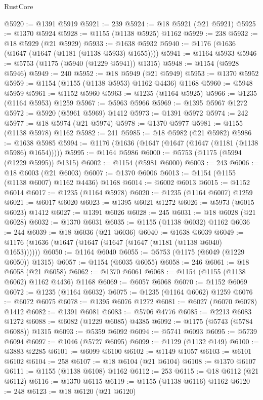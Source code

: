 \begin{lexlean}{RustCore}
\begin{coremodule}
@5920 := @1391 @5919
@5921 := 239
@5924 := @18 @5921 (@21 @5921)
@5925 := @1370 @5924
@5928 := @1155 (@1138 @5925) @1162
@5929 := 238
@5932 := @18 @5929 (@21 @5929)
@5933 := @1638 @5932
@5940 := @1176 (@1636 (@1647 (@1647 (@1181 (@1138 @5933) @1655))))
@5941 := @1164 @5933
@5946 := @5753 (@1175 (@5940 (@1229 @5941)) @1315)
@5948 := @1154 (@5928 @5946)
@5949 := 240
@5952 := @18 @5949 (@21 @5949)
@5953 := @1370 @5952
@5959 := @1154 (@1155 (@1138 @5953) @1162 @4436) @1168
@5960 := @5948 @5959
@5961 := @1152 @5960
@5963 := @1235 (@1164 @5925)
@5966 := @1235 (@1164 @5953) @1259
@5967 := @5963 @5966
@5969 := @1395 @5967 @1272
@5972 := @5920 (@5961 @5969) @1412
@5973 := @1391 @5972
@5974 := 242
@5977 := @18 @5974 (@21 @5974)
@5978 := @1370 @5977
@5981 := @1155 (@1138 @5978) @1162
@5982 := 241
@5985 := @18 @5982 (@21 @5982)
@5986 := @1638 @5985
@5994 := @1176 (@1636 (@1647 (@1647 (@1647 (@1181 (@1138 @5986) @1654)))))
@5995 := @1164 @5986
@6000 := @5753 (@1175 (@5994 (@1229 @5995)) @1315)
@6002 := @1154 (@5981 @6000)
@6003 := 243
@6006 := @18 @6003 (@21 @6003)
@6007 := @1370 @6006
@6013 := @1154 (@1155 (@1138 @6007) @1162 @4436) @1168
@6014 := @6002 @6013
@6015 := @1152 @6014
@6017 := @1235 (@1164 @5978)
@6020 := @1235 (@1164 @6007) @1259
@6021 := @6017 @6020
@6023 := @1395 @6021 @1272
@6026 := @5973 (@6015 @6023) @1412
@6027 := @1391 @6026
@6028 := 245
@6031 := @18 @6028 (@21 @6028)
@6032 := @1370 @6031
@6035 := @1155 (@1138 @6032) @1162
@6036 := 244
@6039 := @18 @6036 (@21 @6036)
@6040 := @1638 @6039
@6049 := @1176 (@1636 (@1647 (@1647 (@1647 (@1647 (@1181 (@1138 @6040) @1653))))))
@6050 := @1164 @6040
@6055 := @5753 (@1175 (@6049 (@1229 @6050)) @1315)
@6057 := @1154 (@6035 @6055)
@6058 := 246
@6061 := @18 @6058 (@21 @6058)
@6062 := @1370 @6061
@6068 := @1154 (@1155 (@1138 @6062) @1162 @4436) @1168
@6069 := @6057 @6068
@6070 := @1152 @6069
@6072 := @1235 (@1164 @6032)
@6075 := @1235 (@1164 @6062) @1259
@6076 := @6072 @6075
@6078 := @1395 @6076 @1272
@6081 := @6027 (@6070 @6078) @1412
@6082 := @1391 @6081
@6083 := @5706 @4776
@6085 := @2213 @6083 @1272
@6088 := @6082 (@1229 @6085) @4385
@6092 := @1175 (@5743 (@5784 @6088)) @1315
@6093 := @5359 @6092
@6094 := @5741 @6093
@6095 := @5739 @6094
@6097 := @1046 (@5727 @6095)
@6099 := @1129 (@1132 @149)
@6100 := @3883 @2285
@6101 := @6099 @6100
@6102 := @1149 @1057
@6103 := @6101 @6102
@6104 := 258
@6107 := @18 @6104 (@21 @6104)
@6108 := @1370 @6107
@6111 := @1155 (@1138 @6108) @1162
@6112 := 253
@6115 := @18 @6112 (@21 @6112)
@6116 := @1370 @6115
@6119 := @1155 (@1138 @6116) @1162
@6120 := 248
@6123 := @18 @6120 (@21 @6120)

\end{coremodule}
\end{lexlean}
